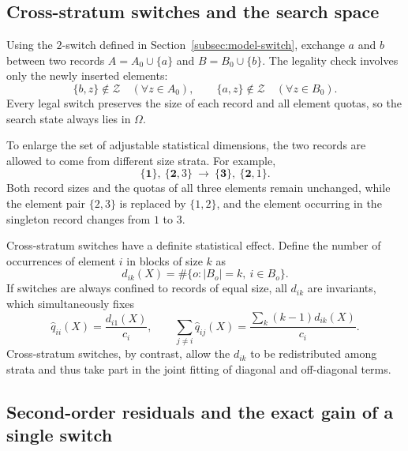 \documentclass[11pt,a4paper]{article}
\numberwithin{equation}{section}
\theoremstyle{definition}
\numberwithin{algorithm}{section}
\begin{document}
\subsection{Cross-stratum switches and the search space}\label{subsec:baseline-switch}

Using the $2$-switch defined in Section~\ref{subsec:model-switch}, exchange $a$ and $b$
between two records $A=A_0\cup\{a\}$ and $B=B_0\cup\{b\}$.
The legality check involves only the newly inserted elements:
\begin{equation}
\{b,z\}\notin\mathcal Z\quad(\forall z\in A_0),\qquad
\{a,z\}\notin\mathcal Z\quad(\forall z\in B_0).
\label{eq:baseline-swap-legal}
\end{equation}
Every legal switch preserves the size of each record and all element quotas, so the search
state always lies in $\Omega$.

To enlarge the set of adjustable statistical dimensions, the two records are allowed to
come from different size strata.
For example,
\begin{equation}
\{\mathbf1\},\ \{\mathbf2,3\}
\ \longrightarrow\
\{\mathbf3\},\ \{\mathbf2,1\}.
\label{eq:baseline-cross-stratum}
\end{equation}
Both record sizes and the quotas of all three elements remain unchanged, while the element
pair $\{2,3\}$ is replaced by $\{1,2\}$, and the element occurring in the singleton record
changes from $1$ to $3$.

Cross-stratum switches have a definite statistical effect.
Define the number of occurrences of element $i$ in blocks of size $k$ as
\begin{equation}
d_{ik}(X)=\#\{o:|B_o|=k,\ i\in B_o\}.
\label{eq:baseline-layer-count}
\end{equation}
If switches are always confined to records of equal size, all $d_{ik}$ are invariants,
which simultaneously fixes
\begin{equation}
\widehat q_{ii}(X)=\frac{d_{i1}(X)}{c_i},\qquad
\sum_{j\ne i}\widehat q_{ij}(X)
=\frac{\sum_k(k-1)d_{ik}(X)}{c_i}.
\label{eq:baseline-layer-invariant}
\end{equation}
Cross-stratum switches, by contrast, allow the $d_{ik}$ to be redistributed among strata and
thus take part in the joint fitting of diagonal and off-diagonal terms.

\subsection{Second-order residuals and the exact gain of a single switch}\label{subsec:baseline-local-delta}
\end{document}
